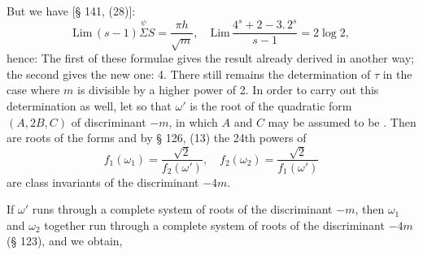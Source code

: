 
But we have [§ 141, (28)]:
\[
\mathrm{Lim}\,(s-1) \overset{\psi}{\Sigma} S = \frac{\pi h}{\sqrt{m}}, \quad \mathrm{Lim}\,\frac{4^s + 2 - 3.\,2^s}{s-1} = 2 \log 2,
\]
hence:
The first of these formulae gives the result already derived in another
way; the second gives the new one:
4. There still remains the determination of $\tau$ in the case where
$m$ is divisible by a higher power of 2. In order to carry out this
determination as well, let
so that $\omega'$ is the root of the quadratic form $(A, 2B, C)$ of
discriminant $-m$, in which $A$ and $C$ may be assumed to be . Then
are roots of the forms
and by § 126, (13) the 24th powers of
\[
f_1(\omega_1) = \frac{\sqrt{2}}{f_2(\omega')}, \quad f_2(\omega_2) = \frac{\sqrt{2}}{f_1(\omega')}
\]
are class invariants of the discriminant $-4m$.

If $\omega'$ runs through a complete system of roots of the discriminant $-m$, then $\omega_1$ and $\omega_2$ together run through a complete
system of roots of the discriminant $-4m$ (§ 123), and we obtain,
